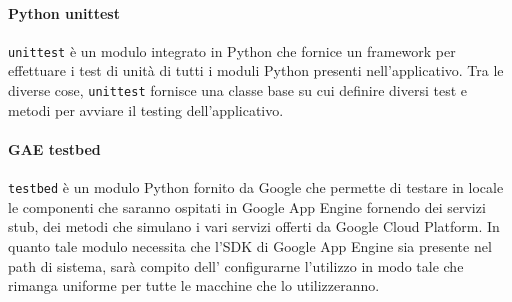 			\paragraph{Python unittest}
			\texttt{unittest} è un modulo integrato in Python che fornice un framework per effettuare i test di unità di tutti i moduli Python presenti nell'applicativo. Tra le diverse cose, \texttt{unittest} fornisce una classe base su cui definire diversi test e metodi per avviare il testing dell'applicativo.

			\paragraph{GAE testbed} %
			\label{par:testbed_gae}
			\texttt{testbed} è un modulo Python fornito da Google che permette di testare in locale le componenti che saranno ospitati in Google App Engine fornendo dei servizi stub, dei metodi che simulano i vari servizi offerti da Google Cloud Platform.  In quanto tale modulo necessita che l'SDK di Google App Engine sia presente nel path di sistema, sarà compito dell'\roleAdministrator{} configurarne l'utilizzo in modo tale che rimanga uniforme per tutte le macchine che lo utilizzeranno.

